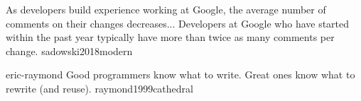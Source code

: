\documentclass{article}
\begin{document}
  {As developers build experience working at Google, the average number of comments on their changes decreases... Developers at Google who have started within the past year typically have more than twice as many comments per change.}
  {sadowski2018modern}

\qte
  {eric-raymond}
  {Good programmers know what to write. Great ones know what to rewrite (and reuse).}
  {raymond1999cathedral}
\end{document}
